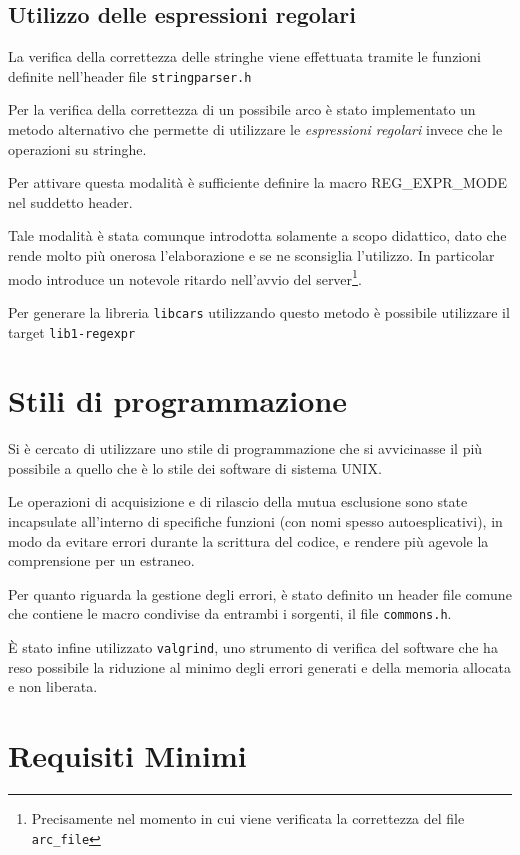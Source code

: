 \documentclass[a4paper,10pt]{article}
\begin{document}
\subsection{Utilizzo delle espressioni regolari}

La verifica della correttezza delle stringhe viene effettuata tramite le funzioni definite nell'header file \texttt{stringparser.h}

Per la verifica della correttezza di un possibile arco \`e stato implementato un metodo alternativo che permette di utilizzare le \textit{espressioni regolari} invece che le operazioni su stringhe.

Per attivare questa modalit\`a \`e sufficiente definire la macro REG\_EXPR\_MODE nel suddetto header.

Tale modalit\`a \`e stata comunque introdotta solamente a scopo didattico, dato che rende molto pi\`u onerosa l'elaborazione e se ne sconsiglia l'utilizzo. In particolar modo introduce un notevole ritardo nell'avvio del server\footnote{Precisamente nel momento in cui viene verificata la correttezza del file \texttt{arc\_file}}.

Per generare la libreria \texttt{libcars} utilizzando questo metodo \`e possibile utilizzare il target \texttt{lib1-regexpr}

\section{Stili di programmazione}

Si \`e cercato di utilizzare uno stile di programmazione che si avvicinasse il pi\`u possibile a quello che \`e lo stile dei software di sistema UNIX.

Le operazioni di acquisizione e di rilascio della mutua esclusione sono state incapsulate all'interno di specifiche funzioni (con nomi spesso autoesplicativi), in modo da evitare errori durante la scrittura del codice, e rendere pi\`u agevole la comprensione per un estraneo.

Per quanto riguarda la gestione degli errori, \`e stato definito un header file comune che contiene le macro condivise da entrambi i sorgenti, il file \texttt{commons.h}.

\`E stato infine utilizzato \texttt{valgrind}, uno strumento di verifica del software che ha reso possibile la riduzione al minimo degli errori generati e della memoria allocata e non liberata.

\section{Requisiti Minimi}
\end{document}
